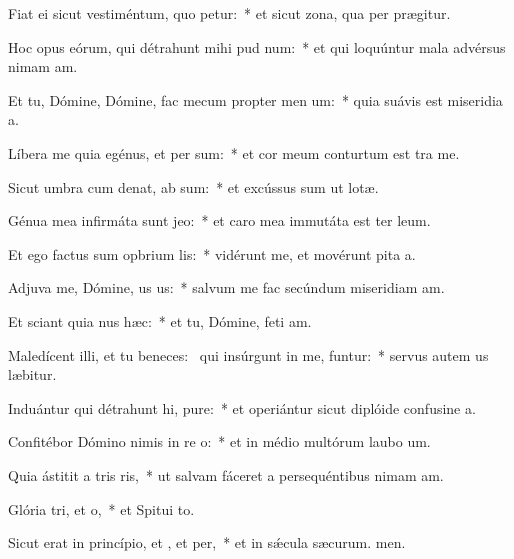 \item Fiat ei sicut vestiméntum, quo petur:~* et sicut zona, qua per prægitur.
\item Hoc opus eórum, qui détrahunt mihi pud num:~* et qui loquúntur mala advérsus nimam am.
\item Et tu, Dómine, Dómine, fac mecum propter men um:~* quia suávis est miseridia a.
\item Líbera me quia egénus, et per  sum:~* et cor meum conturtum est tra me.
\item Sicut umbra cum denat, ab sum:~* et excússus sum ut lotæ.
\item Génua mea infirmáta sunt  jeo:~* et caro mea immutáta est ter leum.
\item Et ego factus sum opbrium lis:~* vidérunt me, et movérunt pita a.
\item Adjuva me, Dómine, us us:~* salvum me fac secúndum miseridiam am.
\item Et sciant quia nus  hæc:~* et tu, Dómine, feti am.
\item Maledícent illi, et tu beneces:~\pscross{} qui insúrgunt in me, funtur:~* servus autem us læbitur.
\item Induántur qui détrahunt hi, pure:~* et operiántur sicut diplóide confusine a.
\item Confitébor Dómino nimis in re o:~* et in médio multórum laubo um.
\item Quia ástitit a tris ris,~* ut salvam fáceret a persequéntibus nimam am.
\item Glória tri, et o,~* et Spitui to.
\item Sicut erat in princípio, et , et per,~* et in sǽcula sæcurum. men.
